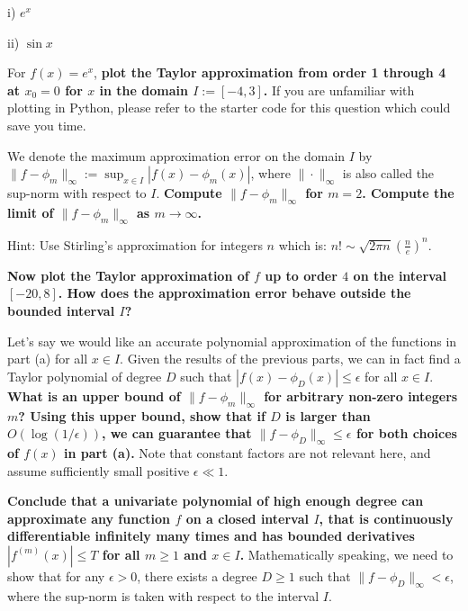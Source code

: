 \documentclass[preview]{standalone}
\begin{document}
\begin{Parts}


i) $e^x$

ii) $\sin x$



\Part For $f(x) = e^x$, {\bf plot the Taylor approximation from order 1 through 4 at $x_0 = 0$ for $x$ in the domain $I:= [-4,3]$.} If you are unfamiliar with plotting in Python, please refer to the starter code for this question which could save you time.

We denote the maximum approximation error on the domain $I$ by $\|f - \phi_m\|_{\infty} := \sup_{x\in I} |f(x) - \phi_m(x)|$, where $\| \cdot\|_{\infty}$ is also called the sup-norm with respect to $I$. {\bf Compute $\|f - \phi_m\|_{\infty}$ for $m=2$.
  Compute the limit of $\|f - \phi_m\|_{\infty}$ as $m\rightarrow \infty$.}

Hint: Use Stirling's approximation for integers $n$ which is: $n! \sim \sqrt{2 \pi n}\left( \frac{n}{e} \right)^n$.

{\bf Now plot the Taylor approximation of $f$ up to order $4$ on the interval $[-20, 8]$. How does the approximation error behave outside the bounded interval $I$?}



  
\Part Let's say we would like an accurate polynomial approximation of
the functions in part (a) for all $x \in I$. Given the results of the
previous parts, we can in fact find a Taylor polynomial
of degree $D$ such that $|f(x) - \phi_D(x)| \leq \epsilon$ for all
$x \in I$. {\bf  What is an upper bound of $\|f - \phi_m\|_{\infty}$ for arbitrary non-zero integers $m$?
  Using this upper bound, show that if $D$ is
  larger than $O(\log(1/\epsilon))$, we can guarantee that
  $\|f - \phi_D\|_{\infty} \leq \epsilon$ for both choices of $f(x)$ in
  part (a).} Note that constant factors are not relevant here, and
assume sufficiently small positive $\epsilon \ll 1$.
  




\Part 
{\bf Conclude that a univariate polynomial of high enough degree can approximate any function $f$ on a closed interval $I$, that is continuously differentiable infinitely many times and has bounded derivatives $|f^{(m)}(x)|\leq T$ for all $m\geq 1$ and $x\in I$.} Mathematically speaking, we need to show that for any $\epsilon > 0$, there exists a degree $D \geq 1$ such that $\|f-\phi_D\|_{\infty} < \epsilon$, where the sup-norm is taken with respect to the interval $I$.


\end{Parts}
\end{document}
